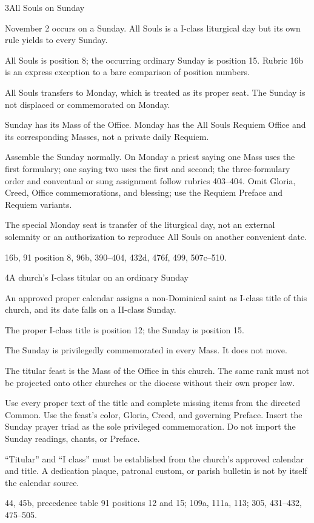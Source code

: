 \begin{casefile}{3}{All Souls on Sunday}
\item[Calendar facts] November 2 occurs on a Sunday.  All Souls is a I-class liturgical day but its own rule yields to every Sunday.
\item[Ranks and rows] All Souls is position 8; the occurring ordinary Sunday is position 15.  Rubric 16b is an express exception to a bare comparison of position numbers.
\item[Impeded item] All Souls transfers to Monday, which is treated as its proper seat.  The Sunday is not displaced or commemorated on Monday.
\item[Mass category] Sunday has its Mass of the Office.  Monday has the All Souls Requiem Office and its corresponding Masses, not a private daily Requiem.
\item[Assembly] Assemble the Sunday normally.  On Monday a priest saying one Mass uses the first formulary; one saying two uses the first and second; the three-formulary order and conventual or sung assignment follow rubrics 403--404.  Omit Gloria, Creed, Office commemorations, and blessing; use the Requiem Preface and Requiem variants.
\item[Boundary] The special Monday seat is transfer of the liturgical day, not an external solemnity or an authorization to reproduce All Souls on another convenient date.
\item[Rubric locus] 16b, 91 position 8, 96b, 390--404, 432d, 476f, 499, 507c--510.
\end{casefile}

\begin{casefile}{4}{A church's I-class titular on an ordinary Sunday}
\item[Calendar facts] An approved proper calendar assigns a non-Dominical saint as I-class title of this church, and its date falls on a II-class Sunday.
\item[Ranks and rows] The proper I-class title is position 12; the Sunday is position 15.
\item[Impeded item] The Sunday is privilegedly commemorated in every Mass.  It does not move.
\item[Mass category] The titular feast is the Mass of the Office in this church.  The same rank must not be projected onto other churches or the diocese without their own proper law.
\item[Assembly] Use every proper text of the title and complete missing items from the directed Common.  Use the feast's color, Gloria, Creed, and governing Preface.  Insert the Sunday prayer triad as the sole privileged commemoration.  Do not import the Sunday readings, chants, or Preface.
\item[Boundary] “Titular” and “I class” must be established from the church's approved calendar and title.  A dedication plaque, patronal custom, or parish bulletin is not by itself the calendar source.
\item[Rubric locus] 44, 45b, precedence table 91 positions 12 and 15; 109a, 111a, 113; 305, 431--432, 475--505.
\end{casefile}


